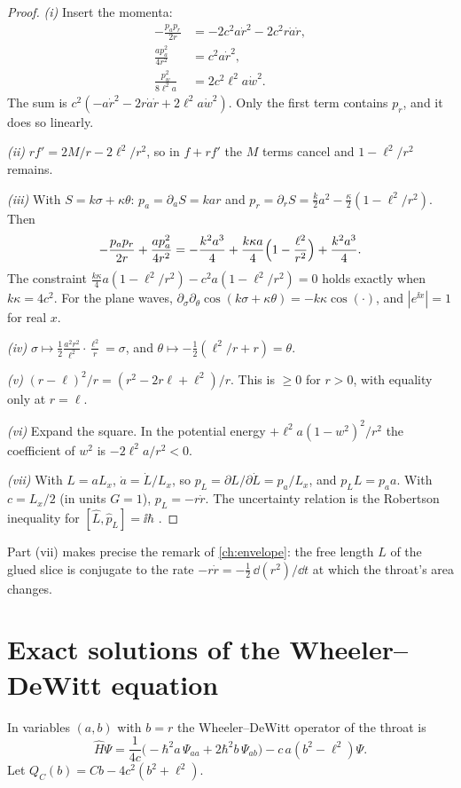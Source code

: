 \begin{proof}
\emph{(i)} Insert the momenta:
\begin{align*}
-\frac{p_ap_r}{2r}&=-2c^2a\dot r^2-2c^2r\dot a\dot r,\\
\frac{ap_a^2}{4r^2}&=c^2a\dot r^2,\\
\frac{p_w^2}{8\ell^2a}&=2c^2\ell^2a\dot w^2 .
\end{align*}
The sum is $c^2(-a\dot r^2-2r\dot a\dot r+2\ell^2a\dot w^2)$. Only the first term contains $p_r$, and it does so linearly.

\emph{(ii)} $rf'=2M/r-2\ell^2/r^2$, so in $f+rf'$ the $M$ terms cancel and $1-\ell^2/r^2$ remains.

\emph{(iii)} With $S=k\sigma+\kappa\theta$: $p_a=\partial_aS=kar$ and $p_r=\partial_rS=\frac k2a^2-\frac\kappa2(1-\ell^2/r^2)$. Then
\[
-\frac{p_ap_r}{2r}+\frac{ap_a^2}{4r^2}=-\frac{k^2a^3}4+\frac{k\kappa a}4\Bigl(1-\frac{\ell^2}{r^2}\Bigr)+\frac{k^2a^3}4 .
\]
The constraint $\frac{k\kappa}4a(1-\ell^2/r^2)-c^2a(1-\ell^2/r^2)=0$ holds exactly when $k\kappa=4c^2$. For the plane waves, $\partial_\sigma\partial_\theta\cos(k\sigma+\kappa\theta)=-k\kappa\cos(\cdot)$, and $|e^{\ii x}|=1$ for real $x$.

\emph{(iv)} $\sigma\mapsto\frac12\frac{a^2r^2}{\ell^2}\cdot\frac{\ell^2}r=\sigma$, and $\theta\mapsto-\frac12(\ell^2/r+r)=\theta$.

\emph{(v)} $(r-\ell)^2/r=(r^2-2r\ell+\ell^2)/r$. This is $\ge0$ for $r>0$, with equality only at $r=\ell$.

\emph{(vi)} Expand the square. In the potential energy $+\ell^2a(1-w^2)^2/r^2$ the coefficient of $w^2$ is $-2\ell^2a/r^2<0$.

\emph{(vii)} With $L=aL_x$, $\dot a=\dot L/L_x$, so $p_L=\partial L/\partial\dot L=p_a/L_x$, and $p_LL=p_aa$. With $c=L_x/2$ (in units $G=1$), $p_L=-r\dot r$. The uncertainty relation is the Robertson inequality for $[\hat L,\hat p_L]=\ii\hbar$ \ext.
\end{proof}


Part (vii) makes precise the remark of \cref{ch:envelope}: the free length $L$ of the glued slice is conjugate to the rate $-r\dot r=-\frac12\,\dd(r^2)/\dd t$ at which the throat's area changes.

\section{Exact solutions of the Wheeler--DeWitt equation}

In variables $(a,b)$ with $b=r$ the Wheeler--DeWitt operator of the throat is
\[
\hat H\Psi=\frac1{4c}\bigl(-\hbar^2a\,\Psi_{aa}+2\hbar^2b\,\Psi_{ab}\bigr)-c\,a(b^2-\ell^2)\Psi .
\]
Let $Q_C(b)=Cb-4c^2(b^2+\ell^2)$.

